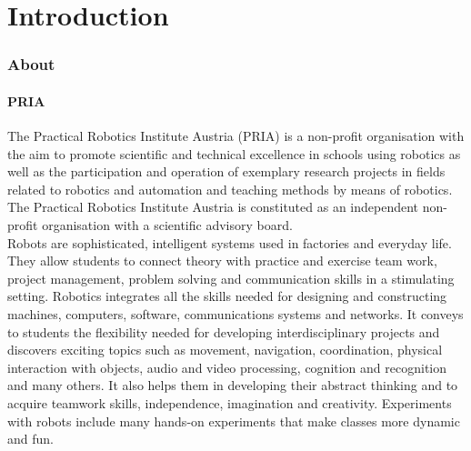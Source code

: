 \documentclass[11pt,a4paper]{article}
\begin{document}

\newpage

\tableofcontents



\newpage
\part{Introduction}


\section{About}
\subsection{PRIA}
The Practical Robotics Institute Austria (PRIA) is a non-profit organisation with the aim to promote scientific and technical excellence in schools using robotics as well as the participation and operation of exemplary research projects in fields related to robotics and automation and teaching methods by means of robotics. The Practical Robotics Institute Austria is constituted as an independent non-profit organisation with a scientific advisory board.\\

Robots are sophisticated, intelligent systems used in factories and everyday life. They allow students to connect theory with practice and exercise team work, project management, problem solving and communication skills in a stimulating setting. Robotics integrates all the skills needed for designing and constructing machines, computers, software, communications systems and networks. It conveys to students the flexibility needed for developing interdisciplinary projects and discovers exciting topics such as movement, navigation, coordination, physical interaction with objects, audio and video processing, cognition and recognition and many others. It also helps them in developing their abstract thinking and to acquire teamwork skills, independence, imagination and creativity. Experiments with robots include many hands-on experiments that make classes more dynamic and fun.\\
\end{document}
